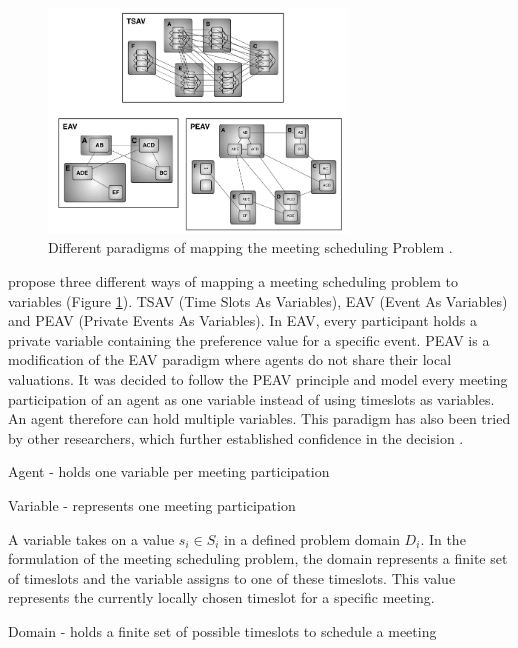 \begin{figure}[h!]
\includegraphics[width=300px]{graphics/variablemodell.png}
\caption{Different paradigms of mapping the meeting scheduling Problem \cite{Maheswarana}.}
\label{fig:variablemapping}
\end{figure}
\cite{Maheswarana} propose three different ways of mapping a meeting scheduling problem to variables (Figure \ref{fig:variablemapping}). TSAV (Time Slots As Variables), EAV (Event As Variables) and PEAV (Private Events As Variables). In EAV, every participant holds a private variable containing the preference value for a specific event. PEAV is a modification of the EAV paradigm where agents do not share their local valuations. It was decided to follow the PEAV principle and model every meeting participation of an agent as one variable instead of using timeslots as variables. An agent therefore can hold multiple variables. This paradigm has also been tried by other researchers, which further established confidence in the decision \cite{Petcu2003}.
\begin{hardconstraint2}
Agent - holds one variable per meeting participation
\end{hardconstraint2}
\begin{hardconstraint2}
Variable - represents one meeting participation
\end{hardconstraint2}
A variable takes on a value \(s_{i} \in S_{i}\) in a defined problem domain \(D_{i}\). In the formulation of the meeting scheduling problem, the domain represents a finite set of timeslots and the variable assigns to one of these timeslots. This value represents the currently locally chosen timeslot for a specific meeting.
\begin{hardconstraint2}
Domain - holds a finite set of possible timeslots to schedule a meeting
\end{hardconstraint2}
